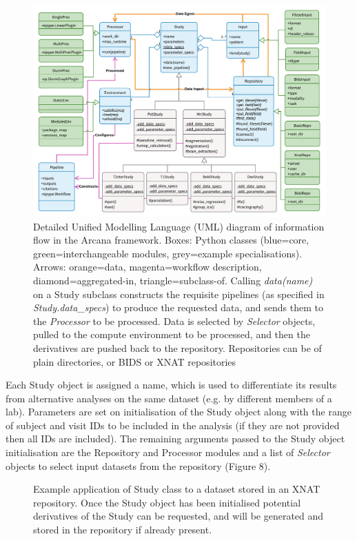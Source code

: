 \begin{figure}
  \begin{center}
    \includegraphics[width=\textwidth]{figures/full_arcana_uml}
  \caption{Detailed Unified Modelling Language (UML) diagram of
information flow in the Arcana framework. Boxes: Python classes
(blue=core, green=interchangeable modules, grey=example
specialisations). Arrows: orange=data, magenta=workflow description,
diamond=aggregated-in, triangle=subclass-of. Calling \emph{data(name)}
on a Study subclass constructs the requisite pipelines (as specified in
\emph{Study.data\_specs}) to produce the requested data, and sends them
to the \emph{Processor} to be processed. Data is selected by
\emph{Selector} objects, pulled to the compute environment to be
processed, and then the derivatives are pushed back to the repository.
Repositories can be of plain directories, or BIDS or XNAT repositories}
\label{fig:full_uml}
\end{center}
\end{figure}

Each Study object is assigned a name, which is used to differentiate its
results from alternative analyses on the same dataset (e.g. by different
members of a lab). Parameters are set on initialisation of the Study
object along with the range of subject and visit IDs to be included in
the analysis (if they are not provided then all IDs are included). The
remaining arguments passed to the Study object initialisation are the
Repository and Processor modules and a list of \emph{Selector} objects
to select input datasets from the repository (Figure 8).

\begin{figure}

\caption{Example application of Study class to a dataset stored in an XNAT
repository. Once the Study object has been initialised potential
derivatives of the Study can be requested, and will be generated and
stored in the repository if already present.}
\label{list:study_application}
\end{figure}

